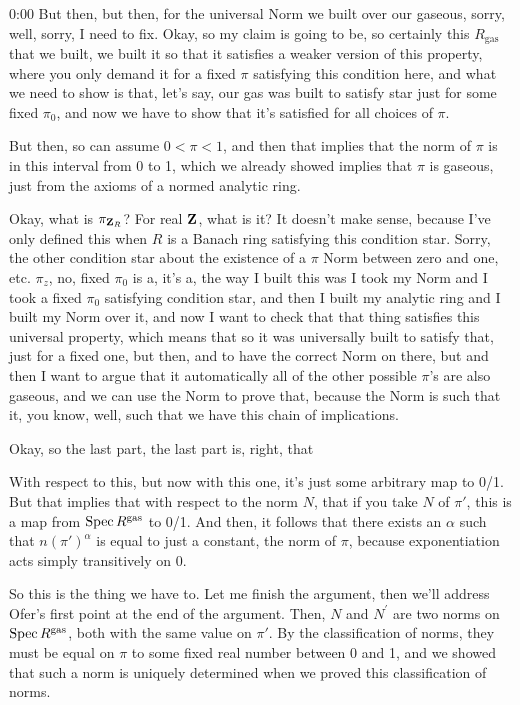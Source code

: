 \begin{unfinished}{0:00}
But then, but then, for the universal Norm we built over our gaseous, sorry, well, sorry, I need to fix. Okay, so my claim is going to be, so certainly this $R_\mathrm{gas}$ that we built, we built it so that it satisfies a weaker version of this property, where you only demand it for a fixed $\pi$ satisfying this condition here, and what we need to show is that, let's say, our gas was built to satisfy star just for some fixed $\pi_0$, and now we have to show that it's satisfied for all choices of $\pi$.

But then, so can assume $0 < \pi < 1$, and then that implies that the norm of $\pi$ is in this interval from 0 to 1, which we already showed implies that $\pi$ is gaseous, just from the axioms of a normed analytic ring.

Okay, what is $\pi_{\mathbf Z_R}$? For real $\mathbf Z$, what is it? It doesn't make sense, because I've only defined this when $R$ is a Banach ring satisfying this condition star. Sorry, the other condition star about the existence of a $\pi$ Norm between zero and one, etc. $\pi_z$, no, fixed $\pi_0$ is a, it's a, the way I built this was I took my Norm and I took a fixed $\pi_0$ satisfying condition star, and then I built my analytic ring and I built my Norm over it, and now I want to check that that thing satisfies this universal property, which means that so it was universally built to satisfy that, just for a fixed one, but then, and to have the correct Norm on there, but and then I want to argue that it automatically all of the other possible $\pi$'s are also gaseous, and we can use the Norm to prove that, because the Norm is such that it, you know, well, such that we have this chain of implications.

Okay, so the last part, the last part is, right, that

With respect to this, but now with this one, it's just some arbitrary map to 0/1. But that implies that with respect to the norm $N$, that if you take $N$ of $\pi'$, this is a map from $\operatorname{Spec} R^{\mathrm{gas}}$ to 0/1. And then, it follows that there exists an $\alpha$ such that $n(\pi')^{\alpha}$ is equal to just a constant, the norm of $\pi$, because exponentiation acts simply transitively on 0.

So this is the thing we have to. Let me finish the argument, then we'll address Ofer's first point at the end of the argument. Then, $N$ and $N^{'}$ are two norms on $\operatorname{Spec} R^{\mathrm{gas}}$, both with the same value on $\pi'$. By the classification of norms, they must be equal on $\pi$ to some fixed real number between 0 and 1, and we showed that such a norm is uniquely determined when we proved this classification of norms.


\end{unfinished}
